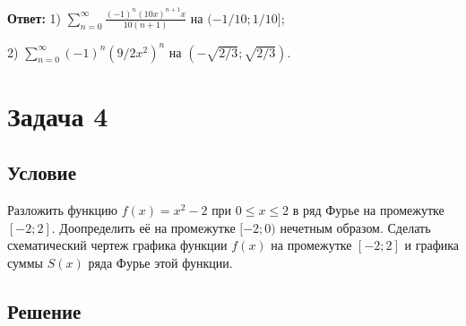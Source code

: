 \documentclass[12pt]{article}
\begin{document}
	\hspace{150pt}\textbf{Ответ:} 1) $ \sum_{n=0}^{\infty} \frac{(-1)^{n} (10x)^{n+1} x}{10(n + 1)} $ на $ (-1/10;1/10] $;

	\hspace{6.6cm} 2) $ \sum_{n=0}^{\infty} (-1)^{n} (9/2x^2)^n $ на $ (-\sqrt{2/3};\sqrt{2/3}) $.

	\newpage

	\section*{Задача 4}	
	\subsection*{Условие}

	Разложить функцию $ f(x) =  x^2 - 2 $ при $ 0 \leq x \leq 2  $ в ряд Фурье на промежутке $ [-2;2] $. Доопределить её на промежутке $ [-2;0) $ нечетным образом.	Сделать схематический чертеж графика функции $ f(x) $ на промежутке $ [-2;2] $ и графика суммы $ S(x) $ ряда Фурье этой функции.

	\subsection*{Решение}
\end{document}
